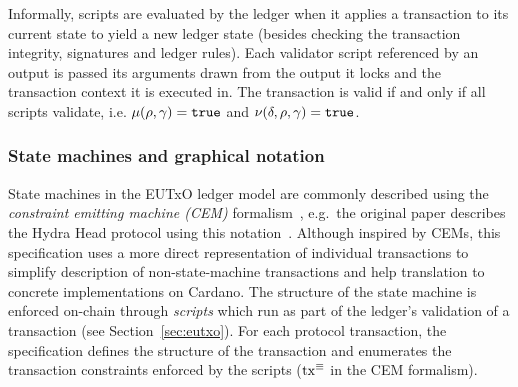 Informally, scripts are evaluated by the ledger when it applies a transaction to
its current state to yield a new ledger state (besides checking the transaction
integrity, signatures and ledger rules). Each validator script referenced by
an output is passed its arguments drawn from the output it locks and the
transaction context it is executed in. The transaction is valid if and only if
all scripts validate, i.e. $\mu(\rho, \gamma) = \mathtt{true}$ and
$\nu(\delta, \rho, \gamma) = \mathtt{true}$.

\subsubsection{State machines and graphical notation}

State machines in the EUTxO ledger model are commonly described using the
\emph{constraint emitting machine (CEM)} formalism~\cite{eutxo}, e.g.~the
original paper describes the Hydra Head protocol using this
notation~\cite{hydrahead20}. Although inspired by CEMs, this specification uses
a more direct representation of individual transactions to simplify description
of non-state-machine transactions and help translation to concrete
implementations on Cardano. The structure of the state machine is enforced
on-chain through \emph{scripts} which run as part of the ledger's validation of
a transaction (see Section~\ref{sec:eutxo}). For each protocol transaction, the
specification defines the structure of the transaction and enumerates the
transaction constraints enforced by the scripts ($\mathrm{tx}^\equiv$ in the CEM
formalism).


